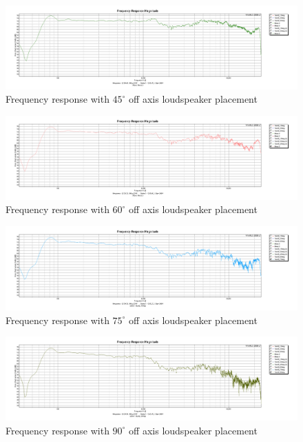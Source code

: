 \documentclass{article}
\begin{document}
\begin{figure}[htbp]
\begin{center}
\includegraphics[width=15cm,keepaspectratio=true]{Figures/TaskBFR45deg}
\caption{Frequency response with $45^\circ$ off axis loudspeaker placement}
\label{fig:TaskBFR45deg}
\end{center}
\end{figure}
\begin{figure}[htbp]
\begin{center}
\includegraphics[width=15cm,keepaspectratio=true]{Figures/TaskBFR60deg}
\caption{Frequency response with $60^\circ$ off axis loudspeaker placement}
\label{fig:TaskBFR60deg}
\end{center}
\end{figure}
\begin{figure}[htbp]
\begin{center}
\includegraphics[width=15cm,keepaspectratio=true]{Figures/TaskBFR75deg}
\caption{Frequency response with $75^\circ$ off axis loudspeaker placement}
\label{fig:TaskBFR75deg}
\end{center}
\end{figure}
\begin{figure}[htbp]
\begin{center}
\includegraphics[width=15cm,keepaspectratio=true]{Figures/TaskBFR90deg}
\caption{Frequency response with $90^\circ$ off axis loudspeaker placement}
\label{fig:TaskBFR90deg}
\end{center}
\end{figure}
\end{document}
